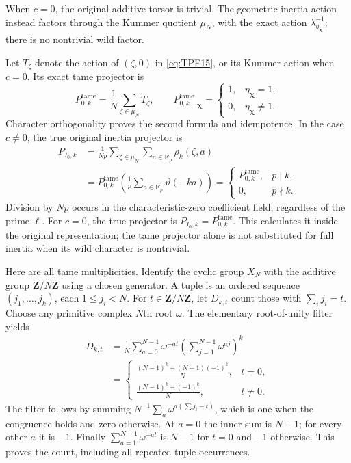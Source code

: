 When \(c=0\), the original additive torsor is trivial.
The geometric inertia action instead factors through
the Kummer quotient \(\mu_N\), with the exact action
\(\lambda_{\eta_{\boldsymbol\chi}}^{-1}\); there is no
nontrivial wild factor.

Let \(T_\zeta\) denote the action of \((\zeta,0)\) in
\eqref{eq:TPF15}, or its Kummer action when \(c=0\).
Its exact tame projector is
\[
 P^{\mathrm{tame}}_{0,k}=\frac1N\sum_{\zeta\in\mu_N}T_\zeta,
 \qquad
 P^{\mathrm{tame}}_{0,k}\big|_{\boldsymbol\chi}
   =\begin{cases}
     1,&\eta_{\boldsymbol\chi}=1,\\
     0,&\eta_{\boldsymbol\chi}\ne1 .
    \end{cases}
 \tag{TPF.16}\label{eq:TPF16}
\]
Character orthogonality proves the second formula and
idempotence. In the case \(c\ne0\), the true original
inertia projector is
\[
 \begin{split}
 P_{I_0,k}
 &=\frac1{Np}\sum_{\zeta\in\mu_N}\sum_{a\in\mathbf F_p}
                         \rho_k(\zeta,a)\\
 &=P^{\mathrm{tame}}_{0,k}
                \left(\frac1p\sum_{a\in\mathbf F_p}
                                      \vartheta(-ka)\right)
 =\begin{cases}
    P^{\mathrm{tame}}_{0,k},&p\mid k,\\
    0,&p\nmid k .
   \end{cases}
 \end{split}
 \tag{TPF.17}\label{eq:TPF17}
\]
Division by \(Np\) occurs in the characteristic-zero
coefficient field, regardless of the prime \(\ell\).
For \(c=0\), the true projector is
\(P_{I_0,k}=P^{\mathrm{tame}}_{0,k}\).
This calculates it inside the original representation;
the tame projector alone is not substituted for full
inertia when its wild character is nontrivial.

Here are all tame multiplicities. Identify the cyclic
group \(X_N\) with the additive group \(\mathbf Z/N\mathbf Z\)
using a chosen generator. A tuple is an ordered sequence
\((j_1,\ldots,j_k)\), each \(1\le j_i<N\).
For \(t\in\mathbf Z/N\mathbf Z\), let \(D_{k,t}\) count
those with \(\sum_i j_i=t\). Choose any primitive complex
\(N\)th root \(\omega\). The elementary root-of-unity
filter yields
\[
 \begin{split}
 D_{k,t}
 &=\frac1N\sum_{a=0}^{N-1}\omega^{-at}
                  \left(\sum_{j=1}^{N-1}\omega^{aj}\right)^k\\
 &=\begin{cases}
 \displaystyle\frac{(N-1)^k+(N-1)(-1)^k}{N},&t=0,\\[4pt]
 \displaystyle\frac{(N-1)^k-(-1)^k}{N},&t\ne0 .
 \end{cases}
 \end{split}
 \tag{TPF.18}\label{eq:TPF18}
\]
The filter follows by summing
\(N^{-1}\sum_a\omega^{a(\sum j_i-t)}\), which is one
when the congruence holds and zero otherwise.
At \(a=0\) the inner sum is \(N-1\); for every other
\(a\) it is \(-1\). Finally
\(\sum_{a=1}^{N-1}\omega^{-at}\) is \(N-1\) for \(t=0\)
and \(-1\) otherwise. This proves the count, including
all repeated tuple occurrences.

